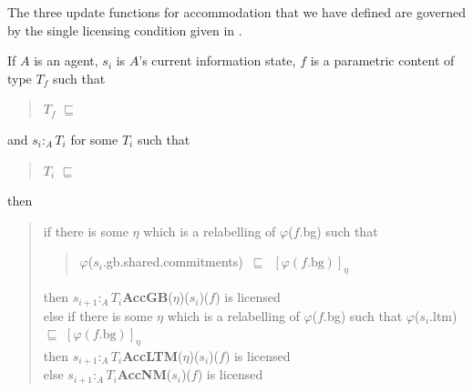 The three update functions for accommodation that we have defined are
governed by the single licensing condition given in \nexteg{}.
\begin{ex} 
If $A$ is an agent, $s_i$ is $A$'s current information state, $f$ is a
parametric content of type $T_f$ such that
\begin{quote}
$T_f$ $\sqsubseteq$ 
\end{quote}
 and
$s_i:_A T_i$ for some $T_i$ such that 
\begin{quote}
$T_i$ $\sqsubseteq$ 
\end{quote}
then \\
\begin{quote}
if there is some $\eta$ which is a relabelling of $\varphi$($f$.bg) such that 
\begin{quote}
\mbox{$\varphi$($s_i$.gb.shared.commitments) $\sqsubseteq$ $[\varphi(f.\mathrm{bg})]_\eta$}
\end{quote}
then $s_{i+1} :_A
T_i$\fbox{\d{$\wedge$}}\textbf{AccGB}($\eta$)($s_i$)($f$) is
licensed\\[\baselineskip]
else if there is some $\eta$ which is a relabelling of
$\varphi$($f$.bg) such that $\varphi$($s_i$.ltm)
$\sqsubseteq$ $[\varphi(f.\mathrm{bg})]_\eta$\\[.25\baselineskip]
then $s_{i+1} :_A
T_i$\fbox{\d{$\wedge$}}\textbf{AccLTM}($\eta$)($s_i$)($f$) is
licensed\\[\baselineskip] 
else $s_{i+1} :_A
T_i$\fbox{\d{$\wedge$}}\textbf{AccNM}($s_i$)($f$) is
licensed
\end{quote} 
\label{ex:propname-acc-lic}
\end{ex}


